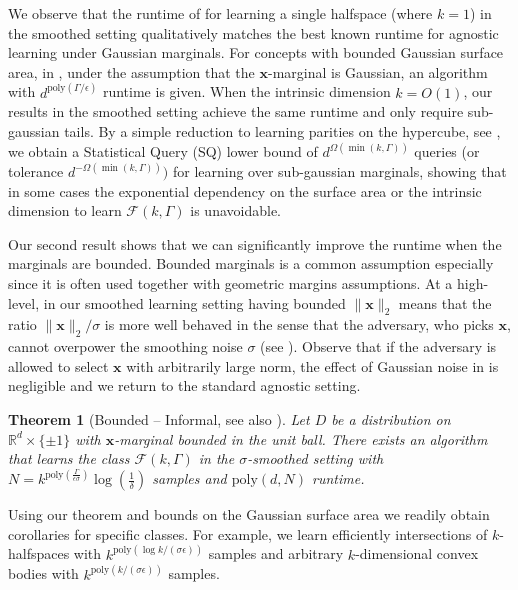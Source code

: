 \documentclass[10pt,a4paper]{article}
\newtheorem{theorem}{Theorem}[section]
\renewcommand\vec[1]{\mathbf{#1}}
\newcommand{\R}{\mathbb{R}}
\newcommand{\eps}{\epsilon}
\newcommand{\poly}{\mathrm{poly}}
\newcommand{\1}{\Ind}
\newcommand{\x}{\vec x}
\begin{document}
We observe that the runtime of  for learning a single halfspace (where $k = 1$) in the smoothed setting qualitatively matches the best known runtime for agnostic learning under Gaussian marginals.  For concepts with bounded Gaussian surface area, in \cite{KOS:08}, under the assumption that the $\x$-marginal is Gaussian, an algorithm with $d^{\poly(\Gamma/\eps)}$ runtime is given.  When the intrinsic dimension $k = O(1)$, our results in the smoothed setting achieve the same runtime and only require sub-gaussian tails.   By a simple reduction to learning parities on the hypercube, see , we obtain a Statistical Query (SQ) lower bound of 
$d^{\Omega(\min(k, \Gamma))}$ queries (or tolerance $d^{-{\Omega(\min(k, \Gamma))}})$ for learning over sub-gaussian marginals, showing that in some cases the exponential dependency on the surface area or the intrinsic dimension to learn $\mathcal{F}(k, \Gamma)$ is unavoidable.  


Our second result shows that we can significantly improve the runtime when the marginals are bounded.
Bounded marginals is a common assumption especially since it is often used together with geometric margins
assumptions.  At a high-level, in our smoothed learning setting having bounded $\|\vec x\|_2$ 
means that the ratio $\|\vec x\|_2/\sigma$ is more well behaved in the sense that the adversary, who picks $\x$, cannot overpower the smoothing noise $\sigma$ (see ). Observe that 
if the adversary is allowed to select $\x$ with arbitrarily large norm, the effect of Gaussian noise in  is negligible and we return to the standard agnostic setting.

\begin{theorem}[Bounded -- Informal, see also ]
\label{thm:intro-bounded}
    Let $D$ be a distribution on $\R^d\times \{\pm 1\}$ with $\x$-marginal bounded in the unit ball.  There exists an algorithm that learns the class $\mathcal{F}(k, \Gamma)$ in
    the $\sigma$-smoothed setting with $N = k^{\poly(\frac{\Gamma}{\epsilon \sigma})}\log(\frac{1}{\delta})$ samples and $\poly(d,N)$ runtime.
\end{theorem}

Using our theorem and bounds on the Gaussian surface area we readily obtain corollaries for specific classes.  For example, we learn efficiently intersections of $k$-halfspaces with $k^{\poly(\log k / (\sigma \eps))}$ samples and arbitrary $k$-dimensional convex bodies  with  $k^{\poly(k/(\sigma \eps) )}$ samples.  
\end{document}
